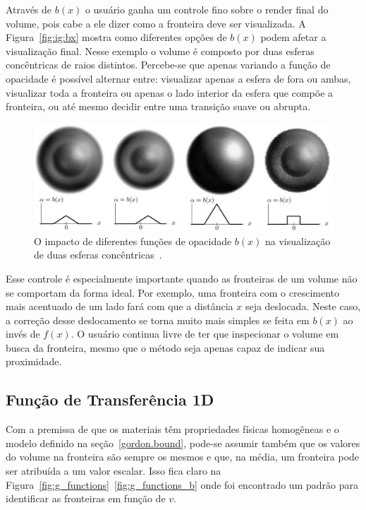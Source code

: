 	Através de $b(x)$ o usuário ganha um controle fino sobre o render final do volume, pois cabe a ele dizer como a fronteira deve ser visualizada. A Figura~\ref{fig:ig:bx} mostra como diferentes opções de $b(x)$ podem afetar a visualização final. Nesse exemplo o volume é composto por duas esferas concêntricas de raios distintos. Percebe-se que apenas variando a função de opacidade é possível alternar entre: visualizar apenas a esfera de fora ou ambas, visualizar toda a fronteira ou apenas o lado interior da esfera que compõe a fronteira, ou até mesmo decidir entre uma transição suave ou abrupta.
	
\begin{figure}[h]
	\centering
	\includegraphics[width=1\textwidth]{images/g_bx}
	\caption{O impacto de diferentes funções de opacidade $b(x)$ na visualização de duas esferas concêntricas~\cite{gordon}.}
	\label{fig:g_bx}
\end{figure}

	Esse controle é especialmente importante quando as fronteiras de um volume não se comportam da forma ideal. Por exemplo, uma fronteira com o crescimento mais acentuado de um lado fará com que a distância $x$ seja deslocada. Neste caso, a correção desse deslocamento se torna muito mais simples se feita em $b(x)$ ao invés de $f(x)$. O usuário continua livre de ter que inspecionar o volume em busca da fronteira, mesmo que o método seja apenas capaz de indicar sua proximidade.
	
\subsection{Função de Transferência 1D}
\label{gordon.1d}
	Com a premissa de que os materiais têm propriedades físicas homogêneas e o modelo definido na seção~\ref{gordon.bound}, pode-se assumir também que os valores do volume na fronteira são sempre os mesmos e que, na média, um fronteira pode ser atribuída a um valor escalar. Isso fica claro na Figura~\ref{fig:g_functions}~\ref{fig:g_functions_b} onde foi encontrado um padrão para identificar as fronteiras em função de $v$.
	
